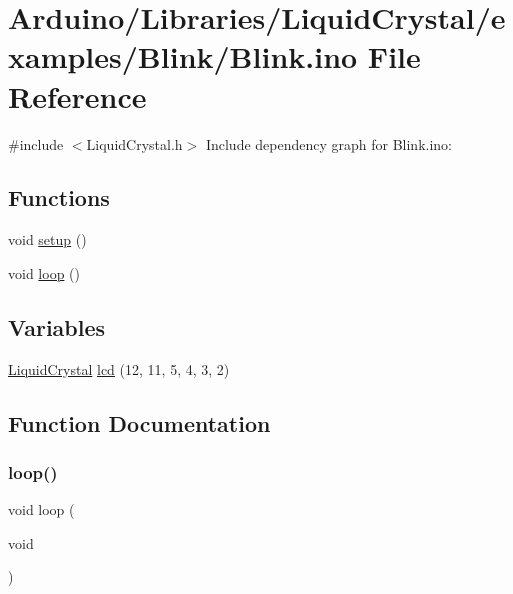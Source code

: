 \hypertarget{_blink_8ino}{}\section{Arduino/\+Libraries/\+Liquid\+Crystal/examples/\+Blink/\+Blink.ino File Reference}
\label{_blink_8ino}
{\ttfamily \#include $<$Liquid\+Crystal.\+h$>$}\newline
Include dependency graph for Blink.\+ino\+:
\subsection*{Functions}
\begin{DoxyCompactItemize}
\item 
void \hyperlink{_blink_8ino_a4fc01d736fe50cf5b977f755b675f11d}{setup} ()
\item 
void \hyperlink{_blink_8ino_afe461d27b9c48d5921c00d521181f12f}{loop} ()
\end{DoxyCompactItemize}
\subsection*{Variables}
\begin{DoxyCompactItemize}
\item 
\hyperlink{class_liquid_crystal}{Liquid\+Crystal} \hyperlink{_blink_8ino_a7226623e632d4109904c86009c9f3b60}{lcd} (12, 11, 5, 4, 3, 2)
\end{DoxyCompactItemize}


\subsection{Function Documentation}
\mbox{\label{_blink_8ino_afe461d27b9c48d5921c00d521181f12f}} 
\subsubsection{\texorpdfstring{loop()}{loop()}}
{\footnotesize\ttfamily void loop (\begin{DoxyParamCaption}\item[{void}]{ }\end{DoxyParamCaption})}

\mbox{\label{_blink_8ino_a4fc01d736fe50cf5b977f755b675f11d}} 
